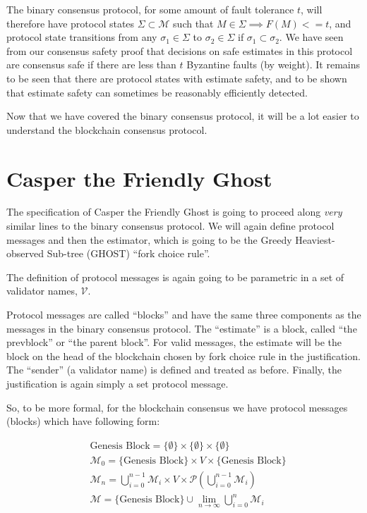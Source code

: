 \documentclass{article}
\theoremstyle{definition}
\begin{document}
The binary consensus protocol, for some amount of fault tolerance $t$, will therefore have protocol states $\Sigma \subset \mathcal{M}$ such that $M \in \Sigma \implies F(M) <= t$, and protocol state transitions from any $\sigma_1 \in \Sigma$ to $\sigma_2 \in \Sigma$ if $\sigma_1 \subset \sigma_2$. We have seen from our consensus safety proof that decisions on safe estimates in this protocol are consensus safe if there are less than $t$ Byzantine faults (by weight). It remains to be seen that there are protocol states with estimate safety, and to be shown that estimate safety can sometimes be reasonably efficiently detected.

Now that we have covered the binary consensus protocol, it will be a lot easier to understand the blockchain consensus protocol.

\section{Casper the Friendly Ghost}

The specification of Casper the Friendly Ghost is going to proceed along \emph{very} similar lines to the binary consensus protocol. We will again define protocol messages and then the estimator, which is going to be the Greedy Heaviest-observed Sub-tree (GHOST) ``fork choice rule''.

The definition of protocol messages is again going to be parametric in a set of validator names, $\mathcal{V}$. 

Protocol messages are called ``blocks'' and have the same three components as the messages in the binary consensus protocol. The ``estimate'' is a block, called ``the prevblock'' or ``the parent block''. For valid messages, the estimate will be the block on the head of the blockchain chosen by fork choice rule in the justification. The ``sender'' (a validator name) is defined and treated as before. Finally, the justification is again simply a set protocol message. 


So, to be more formal, for the blockchain consensus we have protocol messages (blocks) which have following form:

\begin{equation}
\begin{split}
	&\text{Genesis Block} = \{\emptyset\} \times \{\emptyset\} \times \{\emptyset\}\\
    &\mathcal{M}_0 = \{\text{Genesis Block}\} \times V \times \{\text{Genesis Block}\}\\
    &\mathcal{M}_n = \bigcup_{i=0}^{n-1} \mathcal{M}_i \times V \times \mathcal{P}(\bigcup_{i=0}^{n-1} \mathcal{M}_i)\\
    &\mathcal{M} = \{\text{Genesis Block}\} \cup \lim_{n \to \infty} \bigcup_{i=0}^{n} \mathcal{M}_i
\end{split}
\end{equation}
\end{document}
